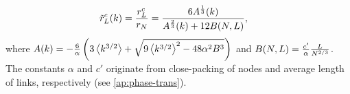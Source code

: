 \documentclass[endfloats,nofootinbib,preprint,floatfix,titlepage,superscriptaddress,linenumbers]{revtex4-1} %
\begin{document}
\begin{align}
    \tilde{r}^c_L(k) = {r^c_L\over r_N} 
    &=\frac{6A^{{1\over 3}}(k)}{A^{\frac{2}{3}}(k) + 12 B(N,L)}, %
    \label{eq:trans-rc-full-1}
\end{align}
where $A(k) =- {6\over \alpha } \left({ 3\left<k^{3/2}\right>} + \sqrt{{ 9 \left<k^{3/2}\right>^2 }- 48 \alpha^2 B^3 }\right)$ and $B(N,L) = {c'\over \alpha}{L\over N^{2/3}}$. 
The constants $\alpha$ and $c'$ originate from close-packing of nodes and average length of links, respectively (see \ref{ap:phase-trans}). 

\end{document}
